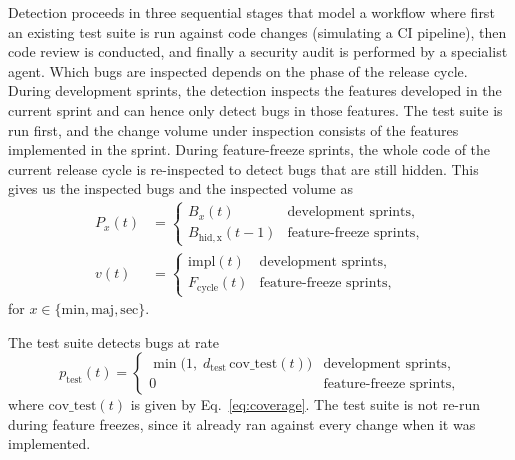 \documentclass[smallextended]{svjour3}       %
\begin{document}
Detection proceeds in three sequential stages that model a workflow where first an existing test suite is run against code
changes (simulating a CI pipeline), then code review is conducted, and finally a security audit is performed by a specialist agent. 
Which bugs are inspected depends on the phase of the release cycle. During development sprints, the detection inspects the features developed in the current sprint and can hence only detect bugs in those features. The test suite is run first, and the change volume under inspection consists of the features implemented in the sprint. During feature-freeze sprints, the whole code of the current release cycle is re-inspected to detect bugs that are still hidden. This gives us the inspected bugs and the inspected volume as
\begin{align}
  P_x(t) &=
  \begin{cases}
    B_x(t) & \text{development sprints},\\[2pt]
    B_\mathrm{hid,x}(t-1) & \text{feature-freeze sprints},
  \end{cases}
  \nonumber \\[4pt]
  v(t) &=
  \begin{cases}
    \mathrm{impl}(t) & \text{development sprints},\\[2pt]
    F_\mathrm{cycle}(t) & \text{feature-freeze sprints},
  \end{cases}
  \label{eq:inspected}
\end{align}
for $x \in \{\mathrm{min,maj,sec}\}$.

The test suite detects bugs at rate
\begin{equation}
  p_\mathrm{test}(t) =
  \begin{cases}
    \min\!\bigl(1,\; d_\mathrm{test}\,\mathrm{cov\_test}(t)\bigr) & \text{development sprints},\\[2pt]
    0 & \text{feature-freeze sprints},
  \end{cases}
  \label{eq:p_test}
\end{equation}
where $\mathrm{cov\_test}(t)$ is given by Eq.~\eqref{eq:coverage}. The test suite is not re-run during feature freezes, since it already ran against every change when it was implemented.
\end{document}
